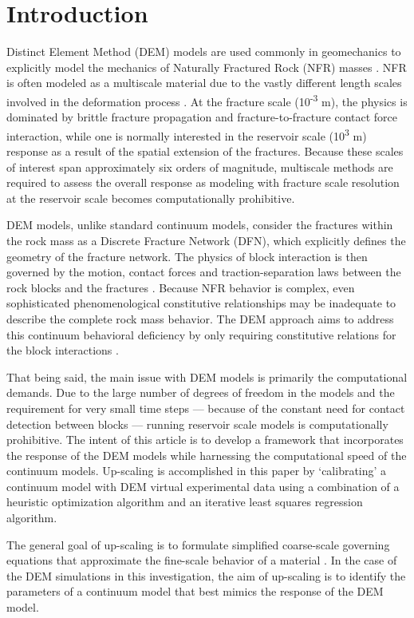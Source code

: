 \section{Introduction}
Distinct Element Method (DEM) models are used commonly in geomechanics to explicitly model the mechanics of Naturally Fractured Rock (NFR) masses \cite{jing_2003}. NFR is often modeled as a multiscale material due to the vastly different length scales involved in the deformation process \cite{zhou_flow_2003}. At the fracture scale (10\textsuperscript{-3} m), the physics is dominated by brittle fracture propagation and fracture-to-fracture contact force interaction, while one is normally interested in the reservoir scale (10\textsuperscript{3} m) response as a result of the spatial extension of the fractures. Because these scales of interest span approximately six orders of magnitude, multiscale methods are required to assess the overall response as modeling with fracture scale resolution at the reservoir scale becomes computationally prohibitive. 

DEM models, unlike standard continuum models, consider the fractures within the rock mass as a Discrete Fracture Network (DFN), which explicitly defines the geometry of the fracture network. The physics of block interaction is then governed by the motion, contact forces and traction-separation laws between the rock blocks and the fractures \cite{Cundall_1979}. Because NFR behavior is complex, even sophisticated phenomenological constitutive relationships may be inadequate to describe the complete rock mass behavior. The DEM approach aims to address this continuum behavioral deficiency by only requiring constitutive relations for the block interactions \cite{Cundall_2001}.

That being said, the main issue with DEM models is primarily the computational demands. Due to the large number of degrees of freedom in the models and the requirement for very small time steps — because of the constant need for contact detection between blocks — running reservoir scale models is computationally prohibitive. The intent of this article is to develop a framework that incorporates the response of the DEM models while harnessing the computational speed of the continuum models. Up-scaling is accomplished in this paper by ‘calibrating’ a continuum model with DEM virtual experimental data using a combination of a heuristic optimization algorithm and an iterative least squares regression algorithm.

The general goal of up-scaling is to formulate simplified coarse-scale governing equations that approximate the fine-scale behavior of a material \cite{Geers_2010}. In the case of the DEM simulations in this investigation, the aim of up-scaling is to identify the parameters of a continuum model that best mimics the response of the DEM model.

